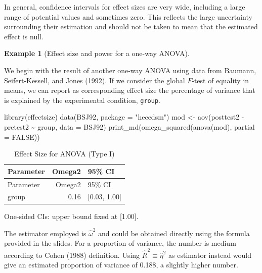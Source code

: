 \documentclass[
  11pt,
  letterpaper,
]{scrbook}
\newenvironment{Shaded}{\begin{snugshade}}{\end{snugshade}}
\newcommand{\AttributeTok}[1]{\textcolor[rgb]{0.40,0.45,0.13}{#1}}
\newcommand{\ConstantTok}[1]{\textcolor[rgb]{0.56,0.35,0.01}{#1}}
\newcommand{\FunctionTok}[1]{\textcolor[rgb]{0.28,0.35,0.67}{#1}}
\newcommand{\NormalTok}[1]{\textcolor[rgb]{0.00,0.23,0.31}{#1}}
\newcommand{\OtherTok}[1]{\textcolor[rgb]{0.00,0.23,0.31}{#1}}
\newcommand{\SpecialCharTok}[1]{\textcolor[rgb]{0.37,0.37,0.37}{#1}}
\newcommand{\StringTok}[1]{\textcolor[rgb]{0.13,0.47,0.30}{#1}}
\theoremstyle{definition}
\newtheorem{example}{Example}[chapter]
\theoremstyle{definition}
\theoremstyle{remark}
\begin{document}
In general, confidence intervals for effect sizes are very wide,
including a large range of potential values and sometimes zero. This
reflects the large uncertainty surrounding their estimation and should
not be taken to mean that the estimated effect is null.

\begin{example}[Effect size and power for a one-way
ANOVA]\protect\hypertarget{exm-power1}{}\label{exm-power1}

We begin with the result of another one-way ANOVA using data from
Baumann, Seifert-Kessell, and Jones (1992). If we consider the global
\(F\)-test of equality in means, we can report as corresponding effect
size the percentage of variance that is explained by the experimental
condition, \texttt{group}.

\begin{Shaded}
\begin{Highlighting}[]
\FunctionTok{library}\NormalTok{(effectsize)}
\FunctionTok{data}\NormalTok{(BSJ92, }\AttributeTok{package =} \StringTok{"hecedsm"}\NormalTok{)}
\NormalTok{mod }\OtherTok{\textless{}{-}} \FunctionTok{aov}\NormalTok{(posttest2 }\SpecialCharTok{{-}}\NormalTok{ pretest2 }\SpecialCharTok{\textasciitilde{}}\NormalTok{ group,}
           \AttributeTok{data =}\NormalTok{ BSJ92)}
\FunctionTok{print\_md}\NormalTok{(}\FunctionTok{omega\_squared}\NormalTok{(}\FunctionTok{anova}\NormalTok{(mod), }\AttributeTok{partial =} \ConstantTok{FALSE}\NormalTok{))}
\end{Highlighting}
\end{Shaded}

\begin{longtable}[]{@{}lrl@{}}
\caption{Effect Size for ANOVA (Type I)}\tabularnewline
\toprule\noalign{}
Parameter & Omega2 & 95\% CI \\
\midrule\noalign{}
\endfirsthead
\toprule\noalign{}
Parameter & Omega2 & 95\% CI \\
\midrule\noalign{}
\endhead
\bottomrule\noalign{}
\endlastfoot
group & 0.16 & {[}0.03, 1.00{]} \\
\end{longtable}

One-sided CIs: upper bound fixed at {[}1.00{]}.

The estimator employed is \(\widehat{\omega}^2\) and could be obtained
directly using the formula provided in the slides. For a proportion of
variance, the number is medium according to Cohen (1988) definition.
Using \(\widehat{R}^2 \equiv \widehat{\eta}^2\) as estimator instead
would give an estimated proportion of variance of 0.188, a slightly
higher number.


\end{example}
\end{document}
